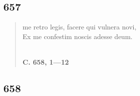 \documentclass[11pt, a4paper]{report}
\begin{document}
            \subsection*{657}
      \begin{verse}
      me retro legis, facere qui vulnera novi, \\ Ex me confestim noscis adesse deum. \\ 
        ﻿\pagebreak 
    \begin{center} \textbf{C. 658, 1—12} \end{center} \marginpar{[130]} 
      \end{verse}
  
            \subsection*{658}
\end{document}
